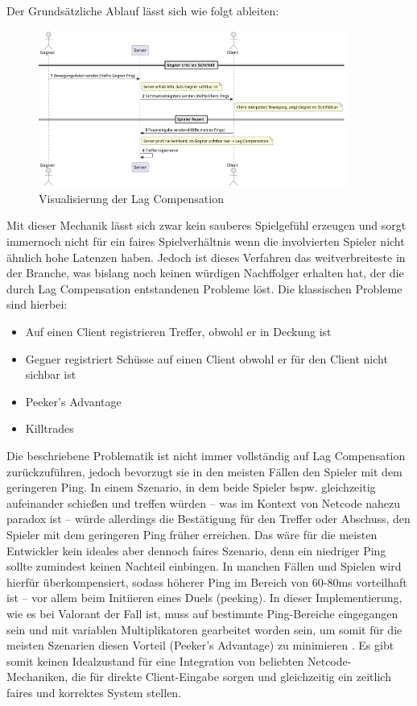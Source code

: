 \begin{enumerate}
Der Grundsätzliche Ablauf lässt sich wie folgt ableiten:
\begin{figure}[h] 
  \centering
  \includegraphics[width=0.9\textwidth, keepaspectratio]{out/diagrams/lag-comp-csgo/lag-comp-csgo.pdf} %
  \caption{Visualisierung der Lag Compensation}
  \label{fig:shhhhshshs}
\end{figure}

Mit dieser Mechanik lässt sich zwar kein sauberes Spielgefühl erzeugen und sorgt immernoch nicht für ein faires Spielverhältnis wenn die involvierten Spieler nicht ähnlich hohe Latenzen haben.
Jedoch ist dieses Verfahren das weitverbreiteste in der Branche, was bislang noch keinen würdigen Nachffolger erhalten hat, der die durch Lag Compensation entstandenen Probleme löst.
Die klassischen Probleme sind hierbei:
\begin{itemize}
  \item Auf einen Client registrieren Treffer, obwohl er in Deckung ist
  \item Gegner registriert Schüsse auf einen Client obwohl er für den Client nicht sichbar ist
  \item Peeker's Advantage
  \item Killtrades
\end{itemize}

Die beschriebene Problematik ist nicht immer vollständig auf Lag Compensation zurückzuführen, jedoch bevorzugt sie in den meisten Fällen den Spieler mit dem geringeren Ping.
In einem Szenario, in dem beide Spieler bspw. gleichzeitig aufeinander schießen und treffen würden -- was im Kontext von Netcode nahezu paradox ist -- würde allerdings die Bestätigung für den Treffer oder Abschuss, den Spieler mit dem geringeren Ping früher erreichen.
Das wäre für die meisten Entwickler kein ideales aber dennoch faires Szenario, denn ein niedriger Ping sollte zumindest keinen Nachteil einbingen. In manchen Fällen und Spielen wird hierfür überkompensiert, sodass höherer Ping im Bereich von 60-80ms vorteilhaft ist -- vor allem beim Initiieren eines Duels (peeking). In dieser Implementierung, wie es bei Valorant der Fall ist, muss auf bestimmte Ping-Bereiche eingegangen sein und mit variablen Multiplikatoren gearbeitet worden sein, um somit für die meisten Szenarien diesen Vorteil (Peeker's Advantage) zu minimieren \cite{valorantPeeker}. 
Es gibt somit keinen Idealzustand für eine Integration von beliebten Netcode-Mechaniken, die für direkte Client-Eingabe sorgen und gleichzeitig ein zeitlich faires und korrektes System stellen. 


\end{enumerate}
